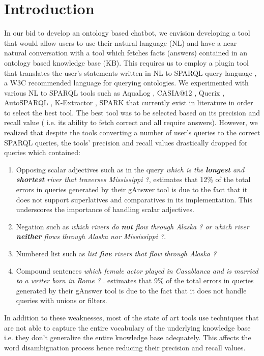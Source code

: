 \documentclass[review]{elsarticle}
\begin{document}
\section{Introduction}
In our bid to develop an ontology based chatbot,  we envision developing a tool that would allow users to  use their natural language (NL) and have a near natural conversation with a tool which fetches facts (answers) contained in an ontology based knowledge base (KB). This requires us to employ a plugin tool that translates the user's statements written in NL to  SPARQL query language \citep{Sparql12},  a W3C recommended language for querying ontologies. We experimented  with various NL to SPARQL tools  such as  AquaLog \citep{aqualog12}, CASIA@12  \citep{Casia12},  Querix \citep{Querix12}, AutoSPARQL \citep{autosparql12},   K-Extractor \citep{Kextractor12},    SPARK \citep{sparklis12} that currently exist in literature in order to select the best  tool. The best tool was to be selected  based on its precision and recall value ( i.e. its ability to fetch correct and all require answers).  However, we realized that despite the tools converting a number of  user's  queries to the correct SPARQL queries,  the tools' precision and recall values drastically dropped  for  queries  which contained:
\begin{enumerate}
\item Opposing scalar adjectives such as in the query
\textit{which is the \textbf{longest} and \textbf{ shortest} river that traverses Mississippi ?}, \citep{g2018} estimates that 12\% of the total errors in  queries generated by their gAnswer tool is due to the fact that it does not  support superlatives and comparatives in its implementation. This underscores the importance of handling scalar adjectives.
\item  Negation such as  \textit{which rivers do\textbf{ not} flow through Alaska ? or which river \textbf{neither} flows through Alaska nor Mississippi ?}.
\item Numbered list such as  \textit{list \textbf{five} rivers that flow through Alaska ?}
\item Compound sentences  \textit{which female actor played in Casablanca and is married to a writer born in Rome ?} . \citep{g2018} estimates that 9\% of the total errors in  queries generated by their gAnswer tool is due to the fact that it does not handle queries with unions or filters.
\end{enumerate} 
In addition to these weaknesses,  most of the state of  art tools use techniques that are not able to capture the entire vocabulary of the underlying knowledge base i.e. they don't generalize the entire knowledge base adequately. This affects the word disambiguation process hence reducing their precision and recall values.
\end{document}
